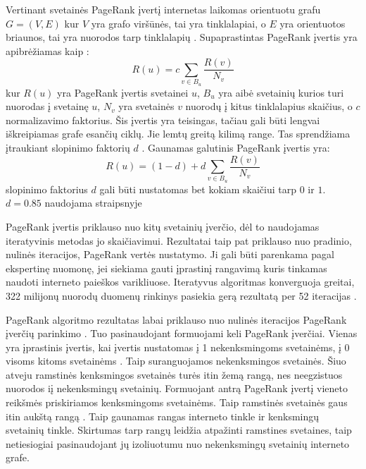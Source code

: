 Vertinant svetainės PageRank įvertį internetas laikomas orientuotu grafu $G = (V, E)$ kur $V$ yra grafo viršūnės, tai yra tinklalapiai, o $E$ yra orientuotos briaunos, tai yra nuorodos tarp tinklalapių \cite{Wu2008}. Supaprastintas PageRank įvertis yra apibrėžiamas kaip \cite{pagerank}:
\begin{equation}
    R(u) = c \sum_{v \in B_u} \frac{R(v)}{N_v}
\end{equation}
kur $R(u)$ yra PageRank įvertis svetainei $u$, $B_u$ yra aibė svetainių kurios turi nuorodas į svetainę $u$, $N_v$ yra svetainės $v$ nuorodų į kitus tinklalapius skaičius, o $c$ normalizavimo faktorius. Šis įvertis yra teisingas, tačiau gali būti lengvai iškreipiamas grafe esančių ciklų. Jie lemtų greitą kilimą range. Tas sprendžiama įtraukiant slopinimo faktorių $d$ \cite{pagerank}. Gaunamas galutinis PageRank įvertis yra:
\begin{equation}
    R(u) = (1 - d) + d \sum_{v \in B_u} \frac{R(v)}{N_v}
\end{equation}
slopinimo faktorius $d$ gali būti nustatomas bet kokiam skaičiui tarp $0$ ir $1$. $d=0.85$ naudojama straipsnyje \cite{pagerank}

 PageRank įvertis priklauso nuo kitų svetainių įverčio, dėl to naudojamas iteratyvinis metodas jo skaičiavimui. Rezultatai taip pat priklauso nuo pradinio, nulinės iteracijos, PageRank vertės nustatymo. Ji gali būti parenkama pagal ekspertinę nuomonę, jei siekiama gauti įprastinį rangavimą kuris tinkamas naudoti interneto paieškos varikliuose.  Iteratyvus algoritmas konverguoja greitai, 322 milijonų nuorodų duomenų rinkinys pasiekia gerą rezultatą per 52 iteracijas \cite{pagerank}.

 PageRank algoritmo rezultatas labai priklauso nuo nulinės iteracijos PageRank įverčių parinkimo \cite{linchpins}. Tuo pasinaudojant formuojami keli PageRank įverčiai. Vienas yra įprastinis įvertis, kai įvertis nustatomas į 1 nekenksmingoms svetainėms, į 0 visoms kitoms svetainėms \cite{linchpins}. Taip suranguojamos nekenksmingos svetainės. Šiuo atveju ramstinės kenksmingos svetainės turės itin žemą rangą, nes neegzistuos nuorodos iį nekenksmingų svetainių. Formuojant antrą PageRank įvertį vieneto reikšmės priskiriamos kenksmingoms svetainėms. Taip ramstinės svetainės gaus itin aukštą rangą \cite{linchpins}. Taip gaunamas rangas interneto tinkle ir kenksmingų svetainių tinkle. Skirtumas tarp rangų leidžia atpažinti ramstines svetaines, taip netiesiogiai pasinaudojant jų izoliuotumu nuo nekenksmingų svetainių interneto grafe.

